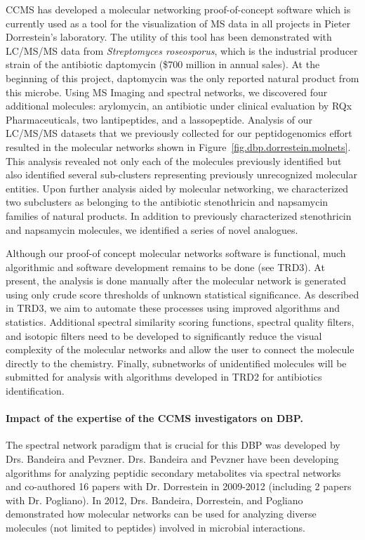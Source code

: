 \documentclass[arial,11pt]{article}
\begin{document}
 CCMS has developed a molecular networking proof-of-concept software which is currently used as a tool for the visualization of MS data in all projects in Pieter Dorrestein's laboratory. The utility of this tool has been demonstrated with LC/MS/MS data from {\em Streptomyces roseosporus}, which is the industrial producer strain of the antibiotic daptomycin (\$700 million in annual sales). At the beginning of this project, daptomycin was the only reported natural product from this microbe. Using MS Imaging and spectral networks, we discovered four additional molecules:  arylomycin, an antibiotic under clinical evaluation by RQx Pharmaceuticals, two lantipeptides, and a lassopeptide. Analysis of our LC/MS/MS datasets that we previously collected for our peptidogenomics effort resulted in the molecular networks shown in Figure~\ref{fig.dbp.dorrestein.molnets}. This analysis revealed not only each of the molecules previously identified but also identified several sub-clusters representing previously unrecognized molecular entities. Upon further analysis aided by molecular networking, we characterized two subclusters as belonging to the antibiotic stenothricin and napsamycin families of natural products. In addition to previously characterized stenothricin and napsamycin molecules, we identified a series of novel analogues.

Although our proof-of concept molecular networks software  is functional, much algorithmic  and software development remains to be done (see TRD3). At present, the analysis is done manually after the molecular network is generated using only crude score thresholds of unknown statistical significance. As described in TRD3, we aim to automate these processes using improved algorithms and statistics. Additional spectral similarity scoring functions, spectral quality filters, and isotopic filters
need to be developed to significantly reduce the visual complexity of the molecular networks and allow the user to connect the molecule directly to the chemistry. Finally, subnetworks of unidentified molecules will be submitted for analysis with algorithms developed in TRD2 for antibiotics identification.



\paragraph{Impact of the expertise of the CCMS investigators on DBP.}
The spectral network paradigm that is crucial for this DBP was developed by  Drs. Bandeira and Pevzner.
Drs. Bandeira and Pevzner have been developing algorithms for
analyzing peptidic secondary metabolites via spectral networks and co-authored 16 papers with Dr. Dorrestein in 2009-2012 (including 2 papers with Dr. Pogliano).
In 2012, Drs. Bandeira, Dorrestein, and Pogliano demonstrated how molecular networks can be used for analyzing diverse molecules (not limited to peptides)  involved
in microbial interactions.
\end{document}
